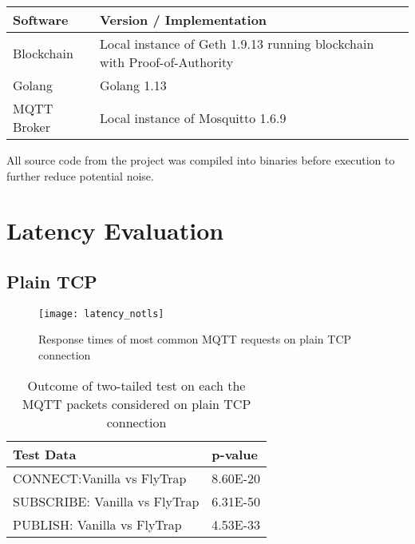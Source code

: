 \begin{table}[]
\centering
\begin{tabular}{|l|l|}
\hline
\textbf{Software} & \textbf{Version / Implementation}                                        \\ \hline
Blockchain        & Local instance of Geth 1.9.13 running blockchain with Proof-of-Authority \\ \hline
Golang            & Golang 1.13                                                              \\ \hline
MQTT Broker       & Local instance of Mosquitto 1.6.9                                        \\ \hline
\end{tabular}
\end{table}

All source code from the project was compiled into binaries before execution to further reduce potential noise.

\section{Latency Evaluation}
\subsection{Plain TCP}
\begin{figure}[h]
    \centering
    \texttt{[image: latency\_notls]}
    \caption{Response times of most common MQTT requests on plain TCP connection}
    \label{fig:latency_notls}
\end{figure}

\begin{table}[]
\centering
\begin{tabular}{|l|l|}
\hline
\textbf{Test Data}   & \textbf{p-value} \\ \hline
CONNECT:Vanilla vs FlyTrap    & 8.60E-20         \\ \hline
SUBSCRIBE: Vanilla vs FlyTrap & 6.31E-50         \\ \hline
PUBLISH: Vanilla vs FlyTrap   & 4.53E-33         \\ \hline
\end{tabular}
\caption{Outcome of two-tailed test on each the MQTT packets considered on plain TCP connection}
\label{tab:ttest-notls}
\end{table}


